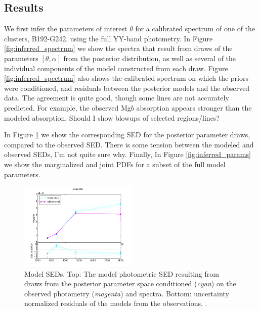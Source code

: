 \documentclass[iop,numberedappendix]{emulateapj}
\newcommand{\excluster}{B192-G242}
\begin{document}
\subsection{Results}

We first infer the parameters of interest $\theta$ for a calibrated
spectrum of one of the clusters, \excluster, using the full YY-band
photometry. In Figure \ref{fig:inferred_spectrum} we show the spectra
that result from draws of the parameters $[\theta,\alpha]$ from the
posterior distribution, as well as several of the individual
components of the model constructed from each draw. Figure
\ref{fig:inferred_spectrum} also shows the calibrated spectrum on
which the priors were conditioned, and residuals between the posterior
models and the observed data.  The agreement is quite good, though
some lines are not accurately predicted.  For example, the observed
Mg$b$ absorption appears stronger than the modeled
absorption. {\color{blue} Should I show blowups of selected regions/lines?}

In Figure \ref{fig:inferred_sed} we show the corresponding SED for the
posterior parameter draws, compared to the observed SED. There is some
tension between the modeled and observed SEDs, I'm not quite sure
why. Finally, In Figure \ref{fig:inferred_params} we show the
marginalized and joint PDFs for a subset of the full model parameters.


\begin{figure}[h!]
\includegraphics[width=0.5\textwidth]{figures/pfig_b192-g242_020_cal.png}
\caption{Model SEDs.  Top: The model photometric SED resulting from draws from the posterior
  parameter space conditioned ({\it cyan}) on the observed photometry
  ({\it magenta})  and spectra.  Bottom: uncertainty normalized
  residuals of the models from the observations. 
 . \label{fig:inferred_sed}}
\end{figure}
\end{document}
